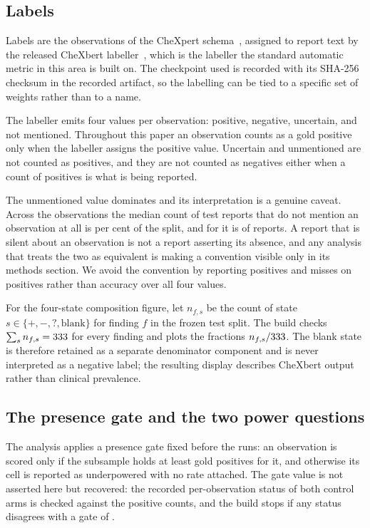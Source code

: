 \subsection{Labels}

Labels are the \NFindings{} observations of the CheXpert schema~\cite{irvin2019chexpert},
assigned to report text by the released CheXbert labeller~\cite{smit2020chexbert},
which is the labeller the standard automatic metric in this area is built on.
The checkpoint used is recorded with its SHA-256 checksum in the recorded artifact, so
the labelling can be tied to a specific set of weights rather than to a name.

The labeller emits four values per observation: positive, negative, uncertain,
and not mentioned. Throughout this paper an observation counts as a gold positive
only when the labeller assigns the positive value. Uncertain and unmentioned are
not counted as positives, and they are not counted as negatives either when a
count of positives is what is being reported.

The unmentioned value dominates and its interpretation is a genuine caveat.
Across the \NFindings{} observations the median count of test reports that do not
mention an observation at all is \MedianBlankPct{} per cent of the split, and for
\MaxBlankFinding{} it is \MaxBlank{} of \NTest{} reports. A report that is silent
about an observation is not a report asserting its absence, and any analysis that
treats the two as equivalent is making a convention visible only in its methods
section. We avoid the convention by reporting positives and misses on positives
rather than accuracy over all four values.

For the four-state composition figure, let \(n_{f,s}\) be the count of state
\(s\in\{+, -, ?, \mathrm{blank}\}\) for finding \(f\) in the frozen test split.
The build checks \(\sum_s n_{f,s}=333{}\) for every finding and plots the
fractions \(n_{f,s}/333{}\). The blank state is therefore retained as a
separate denominator component and is never interpreted as a negative label;
the resulting display describes CheXbert output rather than clinical prevalence.

\subsection{The presence gate and the two power questions}

The analysis applies a presence gate fixed before the runs: an observation is
scored only if the subsample holds at least \MinPresent{} gold positives for it,
and otherwise its cell is reported as underpowered with no rate attached. The
gate value is not asserted here but recovered: the recorded per-observation
status of both control arms is checked against the positive counts, and the build
stops if any status disagrees with a gate of \MinPresent{}.

